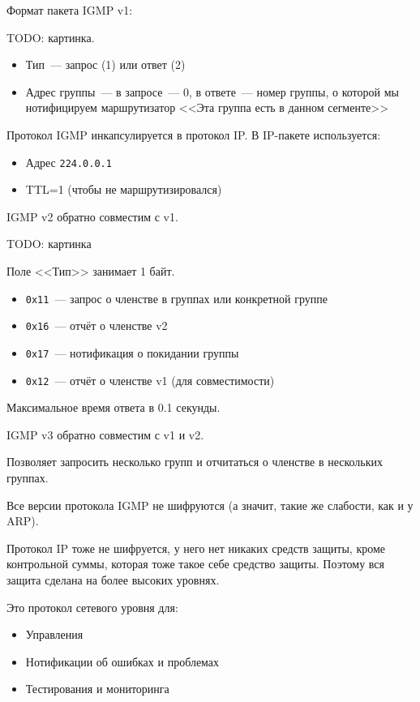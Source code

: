 Формат пакета IGMP v1:

TODO: картинка.

\begin{itemize}
    \item Тип~--- запрос (1) или ответ (2)
    \item Адрес группы~--- в запросе~--- 0, в ответе~--- номер группы, о которой мы нотифицируем маршрутизатор <<Эта группа есть в данном сегменте>>
\end{itemize}

Протокол IGMP инкапсулируется в протокол IP. В IP-пакете используется:
\begin{itemize}
    \item Адрес {\tt 224.0.0.1}
    \item TTL=1 (чтобы не маршрутизировался)
\end{itemize}

IGMP v2 обратно совместим с v1.

TODO: картинка

Поле <<Тип>> занимает 1 байт.
\begin{itemize}
    \item {\tt 0x11}~--- запрос о членстве в группах или конкретной группе
    \item {\tt 0x16}~--- отчёт о членстве v2
    \item {\tt 0x17}~--- нотификация о покидании группы
    \item {\tt 0x12}~--- отчёт о членстве v1 (для совместимости)
\end{itemize}

Максимальное время ответа в 0.1 секунды.

IGMP v3 обратно совместим с v1 и v2.

Позволяет запросить несколько групп и отчитаться о членстве в нескольких группах.

Все версии протокола IGMP не шифруются (а значит, такие же слабости, как и у ARP).

Протокол IP тоже не шифруется, у него нет никаких средств защиты, кроме контрольной суммы, которая тоже такое себе средство защиты. Поэтому вся защита сделана на более высоких уровнях.


Это протокол сетевого уровня для:
\begin{itemize}
    \item Управления
    \item Нотификации об ошибках и проблемах
    \item Тестирования и мониторинга
\end{itemize}

